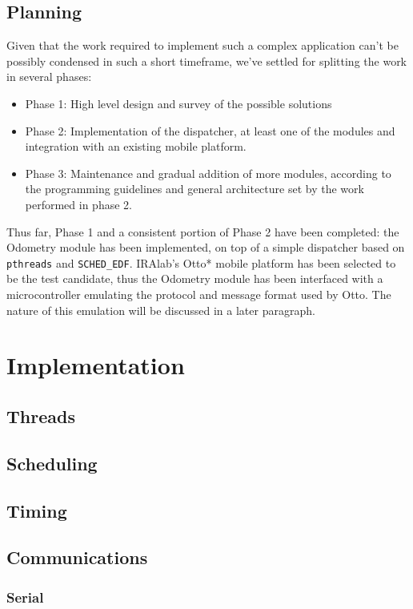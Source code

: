 \documentclass[a4paper,12pt]{report}
\begin{document}
\subsection{Planning}

Given that the work required to implement such a complex application can't be possibly condensed in such a short timeframe, we've settled for splitting the work in several phases:
\begin{itemize}
  \item Phase 1: High level design and survey of the possible solutions
  \item Phase 2: Implementation of the dispatcher, at least one of the
        modules and integration with an existing mobile platform.
  \item Phase 3: Maintenance and gradual addition of more modules,
        according to the programming guidelines and general architecture set
        by the work performed in phase 2.
\end{itemize}

Thus far, Phase 1 and a consistent portion of Phase 2 have been completed: the Odometry module has been implemented, on top of a simple dispatcher based on \texttt{pthreads} and \texttt{SCHED\_EDF}. IRAlab's Otto* mobile platform has been selected to be the test candidate, thus the Odometry module has been interfaced with a microcontroller emulating the protocol and message format used by Otto. The nature of this emulation will be discussed in a later paragraph. %

\section{Implementation}
\subsection{Threads}
\subsection{Scheduling}
\subsection{Timing}
\subsection{Communications}
\subsubsection{Serial}
\end{document}
